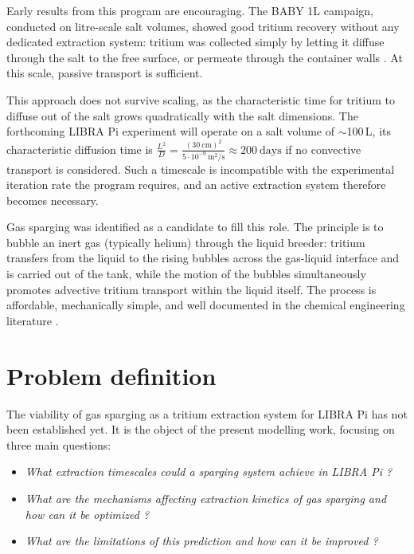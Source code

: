 \documentclass[a4paper,11pt,oneside]{report}
\begin{document}
Early results from this program are encouraging. The BABY 1L campaign, conducted on litre-scale salt volumes, showed good tritium recovery without any dedicated extraction system: tritium was collected simply by letting it diffuse through the salt to the free surface, or permeate through the container walls \cite{delaporte-mathurin_baby_2026}. At this scale, passive transport is sufficient.

This approach does not survive scaling, as the characteristic time for tritium to diffuse out of the salt grows quadratically with the salt dimensions. The forthcoming LIBRA Pi experiment will operate on a salt volume of $\sim$100\,L, its characteristic diffusion time is $\frac{L^2}{D}=\frac{(30\ \mathrm{cm})^2}{5\cdot10^{-9} \ \mathrm{m^2/s}}\approx200 \ \mathrm{days}$ if no convective transport is considered. Such a timescale is incompatible with the experimental iteration rate the program requires, and an active extraction system therefore becomes necessary.

Gas sparging was identified as a candidate to fill this role. The principle is to bubble an inert gas (typically helium) through the liquid breeder: tritium transfers from the liquid to the rising bubbles across the gas-liquid interface and is carried out of the tank, while the motion of the bubbles simultaneously promotes advective tritium transport within the liquid itself. The process is affordable, mechanically simple, and well documented in the chemical engineering literature \cite{deckwer_mixing_1974}.

\section{Problem definition}
\label{sec:problem_def}
The viability of gas sparging as a tritium extraction system for LIBRA Pi has not been established yet. It is the object of the present modelling work, focusing on three main questions:
\begin{itemize}
    \item \textit{What extraction timescales could a sparging system achieve in LIBRA Pi ?}
    \item \textit{What are the mechanisms affecting extraction kinetics of gas sparging and how can it be optimized ?} 
    \item \textit{What are the limitations of this prediction and how can it be improved ?}
\end{itemize}
\end{document}
